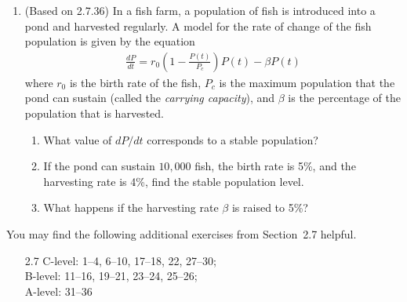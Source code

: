 \documentclass{article}
\begin{document}
\begin{enumerate}
\begin{enumerate}
  \end{enumerate}
\item (Based on 2.7.36) %
  In a fish farm, a population of fish is introduced into a pond and
  harvested regularly.  A model for the rate of change of the fish
  population is given by the equation
  \begin{align*}
    \frac{dP}{dt} = r_0 \left(1-\frac{P(t)}{P_c}\right) P(t) - \beta P(t)
  \end{align*}
  where $r_0$ is the birth rate of the fish, $P_c$ is the maximum population
  that the pond can sustain (called the \textit{carrying capacity}), and
  $\beta$ is the percentage of the population that is harvested.
  \begin{enumerate}
  \item What value of $dP/dt$ corresponds to a stable population?
  \item If the pond can sustain $10,000$ fish, the birth rate is 5\%,
    and the harvesting rate is 4\%, find the stable population level.
  \item What happens if the harvesting rate $\beta$ is raised to 5\%?
  \end{enumerate}
\end{enumerate}

\noindent
You may find the following additional exercises from Section~2.7 helpful.
\begin{itemize}
\item[2.7] C-level: 1--4, 6--10, 17--18, 22, 27--30; \\
  B-level: 11--16, 19--21, 23--24, 25--26; \\
  A-level: 31--36
\end{itemize}
\end{document}
